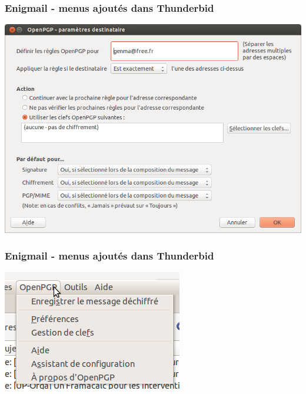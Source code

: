 \documentclass{beamer}
\begin{document}
\begin{frame}
\frametitle{Enigmail - menus ajoutés dans Thunderbid}
\begin{center}
\includegraphics[scale=0.3] {./images/Enigmail01.png}
\end{center}
\end{frame}

\begin{frame}
\frametitle{Enigmail - menus ajoutés dans Thunderbid}
\begin{center}
\includegraphics[scale=0.3] {./images/Menu_Options.png}
\end{center}
\end{frame}
\end{document}
